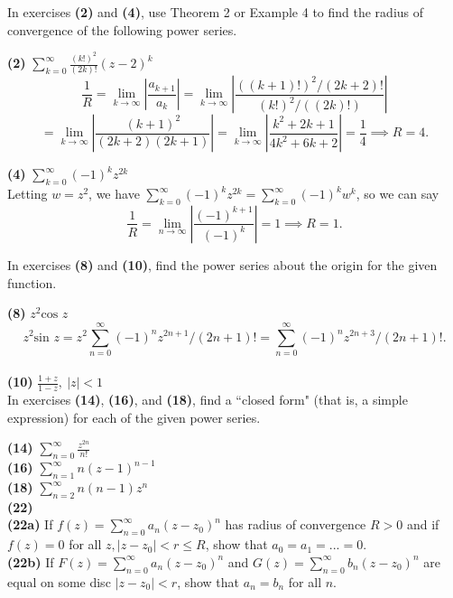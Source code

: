 \documentclass[12pt,letterpaper]{article}
\begin{document}
In exercises \textbf{(2)} and \textbf{(4)}, use Theorem 2 or Example 4 to find the radius of convergence of the following power series.

\textbf{(2)} \(\sum_{k=0}^{\infty}\frac{(k!)^{2}}{(2k)!}(z-2)^{k}\) \\

\[\frac{1}{R} = \lim_{k \to \infty} \left| \frac{a_{k+1}}{a_{k}} \right| = \lim_{k \to \infty} \left| \frac{((k+1)!)^{2}/(2k+2)!}{(k!)^{2}/((2k)!)} \right|\] \[ = \lim_{k \to \infty} \left| \frac{(k+1)^{2}}{(2k+2)(2k+1)} \right| = \lim_{k \to \infty} \left| \frac{k^{2}+2k+1}{4k^{2}+6k+2} \right| = \frac{1}{4} \implies R = 4.\]

\textbf{(4)} \(\sum_{k=0}^{\infty}(-1)^{k}z^{2k}\) \\

Letting \(w = z^{2}\), we have \(\sum_{k=0}^{\infty} (-1)^{k}z^{2k} = \sum_{k=0}^{\infty}(-1)^{k}w^{k}\), so we can say \[\frac{1}{R} = \lim_{n\to \infty} \left| \frac{(-1)^{k+1}}{(-1)^{k}} \right| = 1 \implies R = 1.\]

In exercises \textbf{(8)} and \textbf{(10)}, find the power series about the origin for the given function.

\textbf{(8)} \(z^{2}\text{cos } z\) \\

\[z^{2}\text{sin } z = z^{2} \sum_{n=0}^{\infty} (-1)^{n}z^{2n+1}/(2n+1)! = \sum_{n=0}^{\infty} (-1)^{n}z^{2n+3}/(2n+1)!.\] \\

\textbf{(10)} \(\frac{1+z}{1-z},\ |z|<1\) \\



In exercises \textbf{(14)}, \textbf{(16)}, and \textbf{(18)}, find a ``closed form" (that is, a simple expression) for each of the given power series. 

\textbf{(14)} \(\sum_{n=0}^{\infty} \frac{z^{2n}}{n!}\) \\



\textbf{(16)} \(\sum_{n=1}^{\infty} n(z-1)^{n-1} \) \\



\textbf{(18)} \(\sum_{n = 2}^{\infty} n(n-1)z^{n} \) \\



\textbf{(22)} \\

\textbf{(22a)} If \(f(z) = \sum_{n=0}^{\infty} a_{n}(z-z_{0})^{n}\) has radius of convergence \(R > 0 \) and if \(f(z) = 0\) for all \(z, |z-z_{0}| < r \leq R \), show that \(a_{0} = a_{1} = ... = 0\). \\



\textbf{(22b)} If \(F(z) = \sum_{n=0}^{\infty} a_{n}(z - z_{0})^{n}\) and \(G(z) = \sum_{n=0}^{\infty} b_{n}(z-z_{0})^{n}\) are equal on some disc \(|z - z_{0}|< r\), show that \(a_{n} = b_{n}\) for all \(n\). \\





\textbf{}
\end{document}
